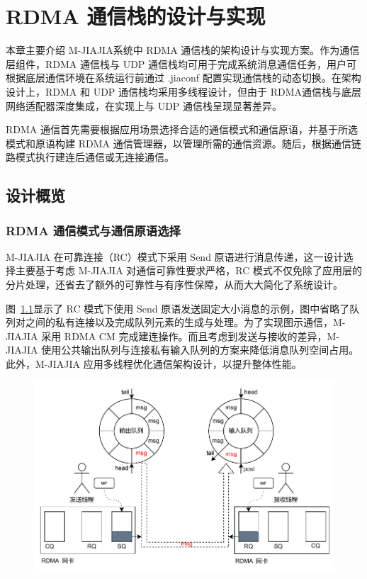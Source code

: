 \chapter{RDMA 通信栈的设计与实现}\label{chap:RJIAJIA}{
    本章主要介绍 M-JIAJIA系统中 RDMA 通信栈的架构设计与实现方案。作为通信层组件，RDMA 通信栈与 UDP 通信栈均可用于完成系统消息通信任务，用户可根据底层通信环境在系统运行前通过 .jiaconf 配置实现通信栈的动态切换。在架构设计上，RDMA 和 UDP 通信栈均采用多线程设计，但由于 RDMA通信栈与底层网络适配器深度集成，在实现上与 UDP 通信栈呈现显著差异。

    RDMA 通信首先需要根据应用场景选择合适的通信模式和通信原语，并基于所选模式和原语构建 RDMA 通信管理器，以管理所需的通信资源。随后，根据通信链路模式执行建连后通信或无连接通信。

    \section{设计概览}

    \subsection{RDMA 通信模式与通信原语选择}

    M-JIAJIA 在可靠连接（RC）模式下采用 Send 原语进行消息传递，这一设计选择主要基于考虑
    M-JIAJIA 对通信可靠性要求严格，RC 模式不仅免除了应用层的分片处理，还省去了额外的可靠性与有序性保障，从而大大简化了系统设计。

    图~\ref{fig:mjiajia-send-recv}显示了 RC 模式下使用 Send 原语发送固定大小消息的示例，图中省略了队列对之间的私有连接以及完成队列元素的生成与处理。为了实现图示通信，M-JIAJIA 采用 RDMA CM 完成建连操作。而且考虑到发送与接收的差异，M-JIAJIA 使用公共输出队列与连接私有输入队列的方案来降低消息队列空间占用。此外，M-JIAJIA 应用多线程优化通信架构设计，以提升整体性能。
    \begin{figure}[H]
        \centering
        \includegraphics[width=\textwidth]{Img/RDMA通信栈可靠链接.drawio.pdf}
        \label{fig:mjiajia-send-recv}
    \end{figure}



}
